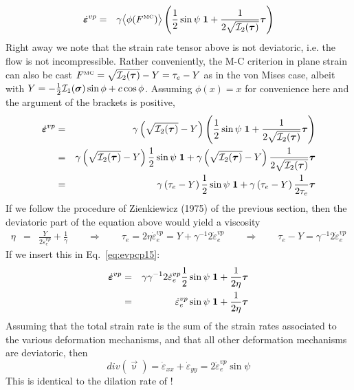 \begin{eqnarray}
\dot{\bm \varepsilon}^{vp} 
&=& \gamma \big\langle \phi( F^{\text{\tiny MC}} )  \big\rangle 
\left(\frac12 \sin\psi \;  {\bm 1} + \frac{1}{2 \sqrt{{\cal I}_2(\bm \tau)}} {\bm \tau} \right)
\end{eqnarray}
Right away we note that the strain rate tensor above is not deviatoric, i.e. the flow
is not incompressible.
Rather conveniently, the M-C criterion in plane strain can also 
be cast $F^{\text{\tiny MC}} = \sqrt{{\cal I}_2(\bm \tau)} -Y = \tau_e - Y$ as in 
the von Mises case, albeit with 
$Y= -\frac12 {\cal I}_1(\bm\sigma) \sin\phi + c\cos\phi$.
Assuming $\phi(x)=x$ for convenience here and the argument of the brackets is positive, 
\begin{eqnarray}
\dot{\bm \varepsilon}^{vp} 
&=& \gamma \left(\sqrt{{\cal I}_2(\bm\tau)} - Y \right)
\left(\frac12 \sin\psi \;  {\bm 1} + \frac{1}{2 \sqrt{{\cal I}_2(\bm \tau)}} {\bm \tau} \right) \nonumber\\
&=& \gamma \left(\sqrt{{\cal I}_2(\bm\tau)} - Y \right)
\frac12 \sin\psi \;  {\bm 1} 
+  
\gamma \left(\sqrt{{\cal I}_2(\bm\tau)} - Y \right)
\frac{1}{2 \sqrt{{\cal I}_2(\bm \tau)}} {\bm \tau}  \nonumber\\
&=& \gamma \left(\tau_e - Y \right)
\frac12 \sin\psi \;  {\bm 1} 
+  
\gamma \left(\tau_e - Y \right)
\frac{1}{2 \tau_e} {\bm \tau}  \label{eq:evpcp15}
\end{eqnarray}
If we follow the procedure of Zienkiewicz (1975) of the previous section, then the deviatoric part
of the equation above would yield a viscosity
\begin{eqnarray}
\eta 
&=& \frac{Y}{2  \dot\varepsilon_e^{vp}}
+ \frac{1 }{\gamma } 
\qquad \Rightarrow \qquad 
\tau_e = 2\eta \dot\varepsilon_e^{vp} = Y + \gamma^{-1} 2  \dot\varepsilon_e^{vp}
\qquad 
\Rightarrow
\qquad
\tau_e - Y = \gamma^{-1} 2  \dot\varepsilon_e^{vp}
\end{eqnarray}
If we insert this in Eq.~\eqref{eq:evpcp15}: 
\begin{eqnarray}
\dot{\bm \varepsilon}^{vp} 
&=& \gamma 
\gamma^{-1} 2  \dot\varepsilon_e^{vp}
\frac12 \sin\psi \;  {\bm 1} 
+  
\frac{1}{2\eta}
{\bm \tau}  \nonumber\\
&=& 
\dot\varepsilon_e^{vp}
\sin\psi \;  {\bm 1} 
+  
\frac{1}{2\eta}
{\bm \tau}  
\end{eqnarray}
Assuming that the total strain rate is the sum of the strain rates 
associated to the various deformation mechanisms, and that all
other deformation mechanisms are deviatoric, then 
\[
div (\vec\upnu)=
\dot{\varepsilon}_{xx}
+
\dot{\varepsilon}_{yy}
=
2  \dot\varepsilon_e^{vp}
\sin\psi 
\]
This 
is identical to the
dilation rate of \textcite{chpe15}!



